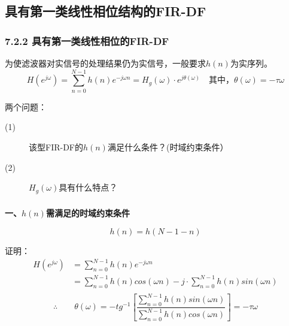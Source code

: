 \documentclass[notheorems,compress,mathserif,table]{beamer}
\begin{document}
\subsection{具有第一类线性相位结构的FIR-DF}
\begin{frame}[shrink]\frametitle{7.2.2 具有第一类线性相位的FIR-DF}%

为使滤波器对实信号的处理结果仍为实信号，一般要求$h(n)$为实序列。
    $$H(e^{j\omega})=\sum_{n=0}^{N-1}h(n)e^{-j\omega n} =H_g(\omega)\cdot e^{j\theta(\omega)}\quad
    \mbox{其中，$\theta(\omega)  = -\tau\omega$}$$


    两个问题：
    \begin{description}
      \item[(1)] 该型FIR-DF的$h(n)$满足什么条件？(时域约束条件）
      \item[(2)] $H_g(\omega)$具有什么特点？
    \end{description}

\end{frame}



\begin{frame}[allowframebreaks]\frametitle{}%

\begin{flushleft}
    \textbf{一、$h(n)$需满足的时域约束条件}
\end{flushleft}
$$h(n) = h(N-1-n)$$

       证明：   %
          \begin{equation*}
            \begin{split}
            H(e^{j\omega})
                 &=\sum_{n=0}^{N-1}h(n)e^{-j\omega n}\\
                 &=\sum_{n=0}^{N-1}h(n)cos(\omega n) - j\cdot\sum_{n=0}^{N-1}h(n)sin(\omega n)\\
          \end{split}
        \end{equation*}
        $$\therefore\quad\quad
        \theta(\omega) = -tg^{-1}\left[\frac{
        \sum_{n=0}^{N-1}h(n)sin(\omega n)}{
        \sum_{n=0}^{N-1}h(n)cos(\omega n)}\right] = -\tau\omega$$
\end{frame}
\end{document}
